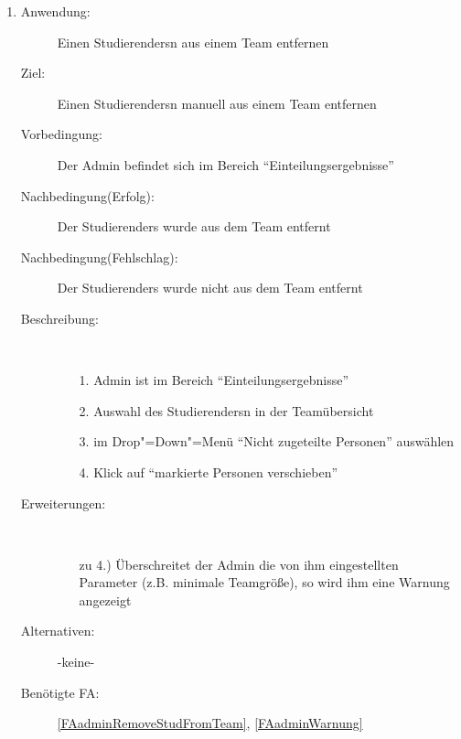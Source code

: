 \documentclass[parskip=full]{scrartcl}
\newcommand{\swtLabel}[1]{\textbf{/#1\arabic*0/}}
\begin{document}
\begin{enumerate} [label=\swtLabel{A}]
  \item \label{UCadminRemoveStudFromTeam}
    \begin{description}
  	\item[Anwendung:] Einen \glspl{Studierender}n aus einem \gls{Team} entfernen
  	\item[Ziel:] Einen \glspl{Studierender}n manuell aus einem \gls{Team} entfernen
  	\item[Vorbedingung:] Der \gls{Admin} befindet sich im Bereich
  	\enquote{\gls{Einteilung}sergebnisse}
  	\item[Nachbedingung(Erfolg):] Der \glspl{Studierender} wurde aus dem \gls{Team} entfernt
  	\item[Nachbedingung(Fehlschlag):] Der \glspl{Studierender} wurde nicht aus dem \gls{Team}
  	entfernt
  	\item[Beschreibung:]~
  	\begin{enumerate}
  	  \item[1.] \gls{Admin} ist im Bereich \enquote{\gls{Einteilung}sergebnisse}
      \item[2.] Auswahl des \glspl{Studierender}n in der \gls{Team}übersicht
      \item[3.] im Drop"=Down"=Menü \enquote{Nicht zugeteilte
      Personen} auswählen
      \item[4.] Klick auf \enquote{markierte Personen verschieben}
  	\end{enumerate}
  	\item[Erweiterungen:]~
  	\begin{enumerate}
  	  \item [zu 4.)] Überschreitet der \gls{Admin} die von ihm eingestellten
  	  Parameter (z.B. minimale \gls{Team}größe), so wird ihm eine Warnung angezeigt
  	\end{enumerate}  
  	\item[Alternativen:] -keine-
  	\item[Benötigte FA:] \ref{FAadminRemoveStudFromTeam}, \ref{FAadminWarnung}
  \end{description}
  

\end{enumerate}
\end{document}
